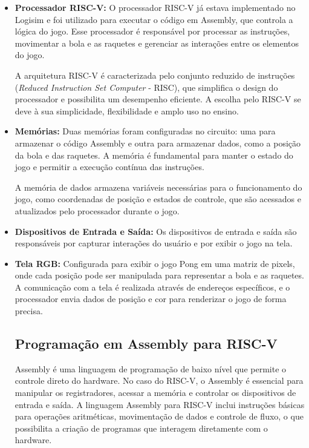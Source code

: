 \documentclass[english, spanish,brazilian]{RBIEarticle} %
\begin{document}
\begin{itemize}
    \item \textbf{Processador RISC-V:}
    O processador RISC-V já estava implementado no Logisim e foi utilizado para executar o código em Assembly, que controla a lógica do jogo. Esse processador é responsável por processar as instruções, movimentar a bola e as raquetes e gerenciar as interações entre os elementos do jogo. 

    A arquitetura RISC-V é caracterizada pelo conjunto reduzido de instruções (\textit{Reduced Instruction Set Computer} - RISC), que simplifica o design do processador e possibilita um desempenho eficiente. A escolha pelo RISC-V se deve à sua simplicidade, flexibilidade e amplo uso no ensino.
    
    \item \textbf{Memórias:}
    Duas memórias foram configuradas no circuito: uma para armazenar o código Assembly e outra para armazenar dados, como a posição da bola e das raquetes. A memória é fundamental para manter o estado do jogo e permitir a execução contínua das instruções.

    A memória de dados armazena variáveis necessárias para o funcionamento do jogo, como coordenadas de posição e estados de controle, que são acessados e atualizados pelo processador durante o jogo.
    
    \item \textbf{Dispositivos de Entrada e Saída:}
    Os dispositivos de entrada e saída são responsáveis por capturar interações do usuário e por exibir o jogo na tela.

    \item \textbf{Tela RGB:} Configurada para exibir o jogo Pong em uma matriz de pixels, onde cada posição pode ser manipulada para representar a bola e as raquetes. A comunicação com a tela é realizada através de endereços específicos, e o processador envia dados de posição e cor para renderizar o jogo de forma precisa.


\subsection{Programação em Assembly para RISC-V}

Assembly é uma linguagem de programação de baixo nível que permite o controle direto do hardware. No caso do RISC-V, o Assembly é essencial para manipular os registradores, acessar a memória e controlar os dispositivos de entrada e saída. A linguagem Assembly para RISC-V inclui instruções básicas para operações aritméticas, movimentação de dados e controle de fluxo, o que possibilita a criação de programas que interagem diretamente com o hardware.


\end{itemize}
\end{document}
